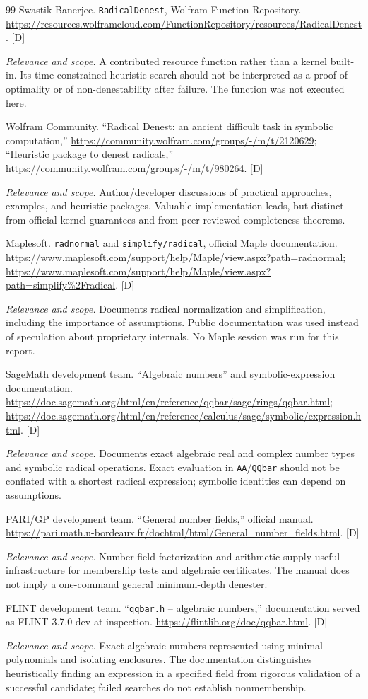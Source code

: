 \documentclass[11pt,letterpaper]{article}
\numberwithin{equation}{section}
\theoremstyle{definition}
\theoremstyle{remark}
\newcommand{\status}[1]{\textsf{\small[#1]}}
\newcommand{\entrynote}[1]{\par\smallskip\noindent\emph{Relevance and scope.} #1}
\begin{document}
\begin{thebibliography}{99}
Swastik Banerjee. \texttt{RadicalDenest}, Wolfram Function Repository. \url{https://resources.wolframcloud.com/FunctionRepository/resources/RadicalDenest}. \status{D}
\entrynote{A contributed resource function rather than a kernel built-in. Its time-constrained heuristic search should not be interpreted as a proof of optimality or of non-denestability after failure. The function was not executed here.}

Wolfram Community. ``Radical Denest: an ancient difficult task in symbolic computation,'' \url{https://community.wolfram.com/groups/-/m/t/2120629}; ``Heuristic package to denest radicals,'' \url{https://community.wolfram.com/groups/-/m/t/980264}. \status{D}
\entrynote{Author/developer discussions of practical approaches, examples, and heuristic packages. Valuable implementation leads, but distinct from official kernel guarantees and from peer-reviewed completeness theorems.}

Maplesoft. \texttt{radnormal} and \texttt{simplify/radical}, official Maple documentation. \url{https://www.maplesoft.com/support/help/Maple/view.aspx?path=radnormal}; \url{https://www.maplesoft.com/support/help/Maple/view.aspx?path=simplify%2Fradical}. \status{D}
\entrynote{Documents radical normalization and simplification, including the importance of assumptions. Public documentation was used instead of speculation about proprietary internals. No Maple session was run for this report.}

SageMath development team. ``Algebraic numbers'' and symbolic-expression documentation. \url{https://doc.sagemath.org/html/en/reference/qqbar/sage/rings/qqbar.html}; \url{https://doc.sagemath.org/html/en/reference/calculus/sage/symbolic/expression.html}. \status{D}
\entrynote{Documents exact algebraic real and complex number types and symbolic radical operations. Exact evaluation in \texttt{AA}/\texttt{QQbar} should not be conflated with a shortest radical expression; symbolic identities can depend on assumptions.}

PARI/GP development team. ``General number fields,'' official manual. \url{https://pari.math.u-bordeaux.fr/dochtml/html/General_number_fields.html}. \status{D}
\entrynote{Number-field factorization and arithmetic supply useful infrastructure for membership tests and algebraic certificates. The manual does not imply a one-command general minimum-depth denester.}

FLINT development team. ``\texttt{qqbar.h} -- algebraic numbers,'' documentation served as FLINT 3.7.0-dev at inspection. \url{https://flintlib.org/doc/qqbar.html}. \status{D}
\entrynote{Exact algebraic numbers represented using minimal polynomials and isolating enclosures. The documentation distinguishes heuristically finding an expression in a specified field from rigorous validation of a successful candidate; failed searches do not establish nonmembership.}


\end{thebibliography}
\end{document}
